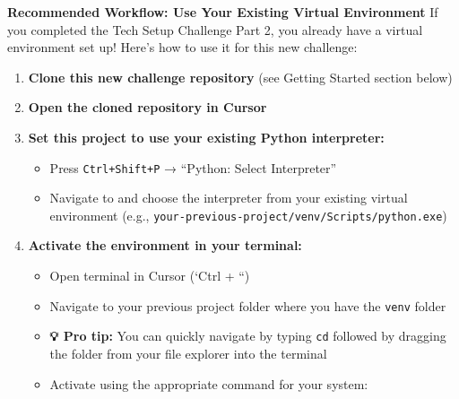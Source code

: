 \documentclass[
  letterpaper,
  DIV=11,
  numbers=noendperiod]{scrartcl}
\providecommand{\tightlist}{%
  \setlength{\itemsep}{0pt}\setlength{\parskip}{0pt}}
\begin{document}
\begin{tcolorbox}[enhanced jigsaw, toptitle=1mm, opacityback=0, colframe=quarto-callout-important-color-frame, leftrule=.75mm, arc=.35mm, opacitybacktitle=0.6, breakable, titlerule=0mm, coltitle=black, bottomtitle=1mm, title=\textcolor{quarto-callout-important-color}{\faExclamation}\hspace{0.5em}{🎯 Note on Python Usage}, colbacktitle=quarto-callout-important-color!10!white, rightrule=.15mm, left=2mm, bottomrule=.15mm, toprule=.15mm, colback=white]

\textbf{Recommended Workflow: Use Your Existing Virtual Environment} If
you completed the Tech Setup Challenge Part 2, you already have a
virtual environment set up! Here's how to use it for this new challenge:

\begin{enumerate}
\def\labelenumi{\arabic{enumi}.}
\tightlist
\item
  \textbf{Clone this new challenge repository} (see Getting Started
  section below)
\item
  \textbf{Open the cloned repository in Cursor}
\item
  \textbf{Set this project to use your existing Python interpreter:}

  \begin{itemize}
  \tightlist
  \item
    Press \texttt{Ctrl+Shift+P} → ``Python: Select Interpreter''
  \item
    Navigate to and choose the interpreter from your existing virtual
    environment (e.g.,
    \texttt{your-previous-project/venv/Scripts/python.exe})
  \end{itemize}
\item
  \textbf{Activate the environment in your terminal:}

  \begin{itemize}
  \tightlist
  \item
    Open terminal in Cursor (`Ctrl + ``)
  \item
    Navigate to your previous project folder where you have the
    \texttt{venv} folder
  \item
    \textbf{💡 Pro tip:} You can quickly navigate by typing \texttt{cd}
    followed by dragging the folder from your file explorer into the
    terminal
  \item
    Activate using the appropriate command for your system:


\end{itemize}
\end{enumerate}
\end{tcolorbox}
\end{document}
